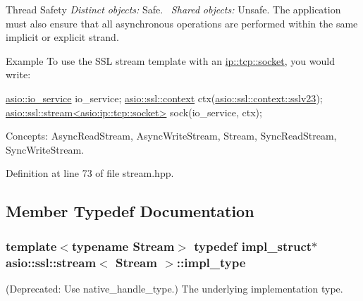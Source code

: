 \begin{DoxyParagraph}{Thread Safety}
{\itshape Distinct} {\itshape objects\+:} Safe.~\newline
{\itshape Shared} {\itshape objects\+:} Unsafe. The application must also ensure that all asynchronous operations are performed within the same implicit or explicit strand.
\end{DoxyParagraph}
\begin{DoxyParagraph}{Example}
To use the S\+S\+L stream template with an \hyperlink{classasio_1_1ip_1_1tcp_a6f5bf95251747bb81d75784387938d6a}{ip\+::tcp\+::socket}, you would write\+: 
\begin{DoxyCode}
\hyperlink{classasio_1_1io__service}{asio::io\_service} io\_service;
\hyperlink{classasio_1_1ssl_1_1context}{asio::ssl::context} ctx(\hyperlink{classasio_1_1ssl_1_1context__base_ac37d498266e3b13607f011ace6417525ae478c3ede58b50c99d6c6ff9ed7c0124}{asio::ssl::context::sslv23});
\hyperlink{classasio_1_1ssl_1_1stream}{asio::ssl::stream<asio:ip::tcp::socket>} sock(io\_service, ctx);
\end{DoxyCode}

\end{DoxyParagraph}
\begin{DoxyParagraph}{Concepts\+:}
Async\+Read\+Stream, Async\+Write\+Stream, Stream, Sync\+Read\+Stream, Sync\+Write\+Stream. 
\end{DoxyParagraph}


Definition at line 73 of file stream.\+hpp.



\subsection{Member Typedef Documentation}
\hypertarget{classasio_1_1ssl_1_1stream_ab97c7dbb5b2ffcf9ee0e63ddc8481ab7}{}
\subsubsection[{impl\+\_\+type}]{\setlength{\rightskip}{0pt plus 5cm}template$<$typename Stream$>$ typedef {\bf impl\+\_\+struct}$\ast$ {\bf asio\+::ssl\+::stream}$<$ Stream $>$\+::{\bf impl\+\_\+type}}\label{classasio_1_1ssl_1_1stream_ab97c7dbb5b2ffcf9ee0e63ddc8481ab7}


(Deprecated\+: Use native\+\_\+handle\+\_\+type.) The underlying implementation type. 



